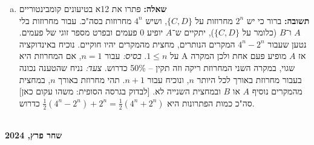 \documentclass[]{article}
\newcommand\bink  {\binom{n}{k}}
\newcommand\nsum[2]   {\reflectbox{\displaystyle\sum_{\reflectbox{\scriptsize$#1$}}^{\reflectbox{\scriptsize$#2$}}}}
\begin{document}
\begin{enumerate}[(a)]
		\pagebreak
		בכל קונטקסט, נסמן $n' = n - k$. סה"כ, כמות האפשרויות מכלל החיבור היא: 
		\begin{alignat}{9}
			  Ans. \, = \; &\sum_{k = 0 \ (even)\ }^n \sum_{m = 0 \ (even)}^{n - k}\bink\binom{n - k}{m}2^{n - k - m}        %
			&&=\sum_{k = 0 \ (even)\ }^n \bink \sum_{m = 0 \ (even)}^{n - k}\binom{m'}{m}2^{m' - m} \\
			= \; &\sum_{k = 0 \ (even)\ }^n \bink \frac{1}{2} \nsum{m = 0}{n - k}\binom{m'}{m}2^{m' - m}                     %
			&&=\sum_{k = 0 \ (even)\ }^n \bink \frac{1}{2} \left [ (2 + 1)^{m'} + (2 - 1)^{m'} \right ] \\
			= \; &\frac{1}{2} \cdot \sum_{k = 0 \ (even)\ }^n \bink 3^{n - k} + \frac{1}{2}\sum_{k = 0 \ (even)\ }^n \bink   %
			&&=\frac{1}{4}\nsum{k = 0}{n} \bink 3^{n - k} + \frac{1}{4}\nsum{k = 0}{n} \bink 1^{n - k} \\
			= \; &\frac{1}{4} \left [ (3 + 1)^n + (3 - 1)^n + (1 + 1)^n + (1 - 1)^n \right ]                                 %
			&&=\frac{1}{4} \left ( 4^n + 2 \cdot 2^n \right ) = 4^{n - 1} + 2^{n + 1 - 2}\\
			= \; &\bm{4^{n - 1} + 2^{n - 1}}                                                                                 %
		\end{alignat}
		\item \textbf{שאלה: }פתרו את 12א בטיעונים קומבינטוריים \\
		\textbf{תשובה: }
		ברור כי יש $2^n$ מחרוזות על $\{C, D\}$, ושיש $4^n$ מחרוזות בסה"כ. עבור מחרוזות בלי $A$ ו־$B$ (כלומר על $\{C, D\}$), יתקיים ש־$A$ יופיע 0 פעמים ובפרט מספר זוגי של פעמים. נטען שעבור $4^n - 2^n$ המקרים הנותרים, מחצית מהמקרים יהיו חוקיים. נוכיח באינדוקציה על $ 1 \le n $. \textit{בסיס: }עבור $n = 1 $, אם המחרוזת היא A אז $A$ מופיע פעם אחת ולכן המקרה שגוי, במקרה השני המחרוזת ריקה וזה תקין – 50\% כדרוש. \textit{צעד: }נניח שהטענה נכונה בעבור מחרוזת באורך לכל היותר $n$, ונוכיח עבור $n + 1 $. תהי מחרוזת באורך $n$, במחצית מהמקרים נוסיף $A$ או $B$ ובמחצית השנייה לא. [לבדוק בגרסה הסופית: משהו עקום כאן] \\
		סה"כ כמות הפתרונות היא $\frac{1}{2} (4^n - 2^n) + 2^n = \frac{1}{2}(4^n + 2^n)$ כדרוש. 
	\end{enumerate}
	
	\dotfill \\
	
	\hfil \textbf{שחר פרץ, 2024} \hfil
	
\end{document}
